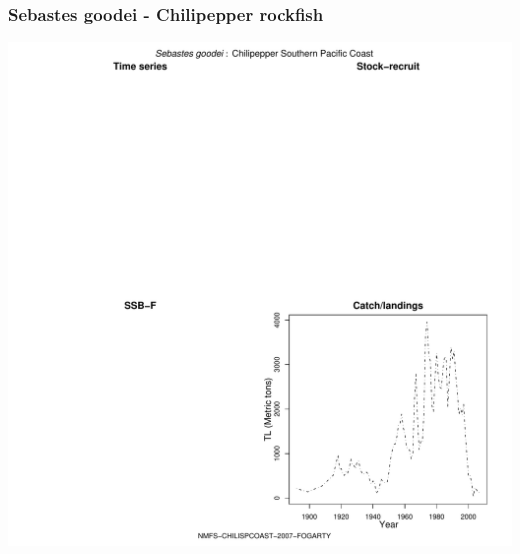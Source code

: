 \subsubsection{Sebastes goodei - Chilipepper rockfish}
\begin{center}
\includegraphics[width=1.2\textwidth]{../R/figures/NMFS-CHILISPCOAST-2007-FOGARTY.pdf}
\end{center}

